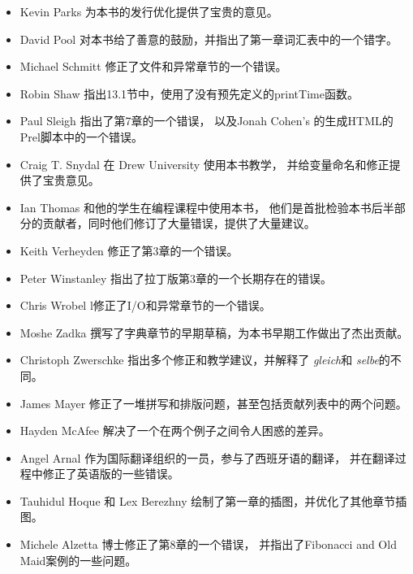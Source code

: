 \documentclass[10pt]{book}
\begin{document}
\begin{itemize}
\item Kevin Parks 为本书的发行优化提供了宝贵的意见。

\item David Pool 对本书给了善意的鼓励，并指出了第一章词汇表中的一个错字。

\item Michael Schmitt 修正了文件和异常章节的一个错误。

\item Robin Shaw 指出13.1节中，使用了没有预先定义的printTime函数。

\item Paul Sleigh 指出了第7章的一个错误，
以及Jonah Cohen's 的生成HTML的Prel脚本中的一个错误。

\item Craig T. Snydal 在 Drew University 使用本书教学，
并给变量命名和修正提供了宝贵意见。

\item Ian Thomas 和他的学生在编程课程中使用本书，
他们是首批检验本书后半部分的贡献者，同时他们修订了大量错误，提供了大量建议。

\item Keith Verheyden 修正了第3章的一个错误。

\item Peter Winstanley 指出了拉丁版第3章的一个长期存在的错误。

\item Chris Wrobel l修正了I/O和异常章节的一个错误。

\item Moshe Zadka 撰写了字典章节的早期草稿，为本书早期工作做出了杰出贡献。

\item Christoph Zwerschke 指出多个修正和教学建议，并解释了
 {\em gleich}和 {\em selbe}的不同。

\item James Mayer 修正了一堆拼写和排版问题，甚至包括贡献列表中的两个问题。

\item Hayden McAfee  解决了一个在两个例子之间令人困惑的差异。

\item Angel Arnal 作为国际翻译组织的一员，参与了西班牙语的翻译，
并在翻译过程中修正了英语版的一些错误。

\item Tauhidul Hoque 和 Lex Berezhny 绘制了第一章的插图，并优化了其他章节插图。

\item Michele Alzetta 博士修正了第8章的一个错误，
并指出了Fibonacci and Old Maid案例的一些问题。


\end{itemize}
\end{document}
